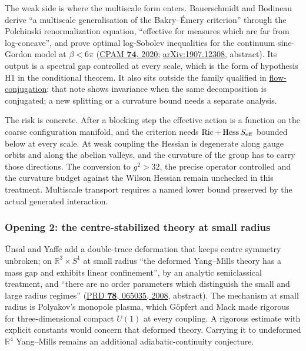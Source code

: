 \documentclass[11pt,a4paper]{article}
\begin{document}
The weak side is where the multiscale form enters. Bauerschmidt and
Bodineau derive ``a multiscale generalisation of the Bakry--Émery
criterion'' through the Polchinski renormalization equation, ``effective
for measures which are far from log-concave'', and prove optimal
log-Sobolev inequalities for the continuum sine-Gordon model at
\(\beta<6\pi\) (\href{https://doi.org/10.1002/cpa.21926}{CPAM
\textbf{74}, 2020};
\href{https://arxiv.org/abs/1907.12308}{arXiv:1907.12308}, abstract).
Its output is a spectral gap controlled at every scale, which is the
form of hypothesis H1 in the conditional theorem. It also sits outside
the family qualified in
\href{flow-conjugation-truncation.md}{flow-conjugation}: that note shows
invariance when the same decomposition is conjugated; a new splitting or
a curvature bound needs a separate analysis.

The risk is concrete. After a blocking step the effective action is a
function on the coarse configuration manifold, and the criterion needs
\(\operatorname{Ric}+\operatorname{Hess}S_{\rm eff}\) bounded below at
every scale. At weak coupling the Hessian is degenerate along gauge
orbits and along the abelian valleys, and the curvature of the group has
to carry those directions. The conversion to \(g^2>32\), the precise
operator controlled and the curvature budget against the Wilson Hessian
remain unchecked in this treatment. Multiscale transport requires a
named lower bound preserved by the actual generated interaction.

\hypertarget{opening-2-the-centre-stabilized-theory-at-small-radius}{%
\subsubsection{Opening 2: the centre-stabilized theory at small
radius}\label{opening-2-the-centre-stabilized-theory-at-small-radius}}

Ünsal and Yaffe add a double-trace deformation that keeps centre
symmetry unbroken; on \(\mathbb R^3\times S^1\) at small radius ``the
deformed Yang--Mills theory has a mass gap and exhibits linear
confinement'', by an analytic semiclassical treatment, and ``there are
no order parameters which distinguish the small and large radius
regimes'' (\href{https://doi.org/10.1103/PhysRevD.78.065035}{PRD
\textbf{78}, 065035, 2008}, abstract). The mechanism at small radius is
Polyakov's monopole plasma, which Göpfert and Mack made rigorous for
three-dimensional compact \(U(1)\) at every coupling. A rigorous
estimate with explicit constants would concern that deformed theory.
Carrying it to undeformed \(\mathbb R^4\) Yang--Mills remains an
additional adiabatic-continuity conjecture.
\end{document}
